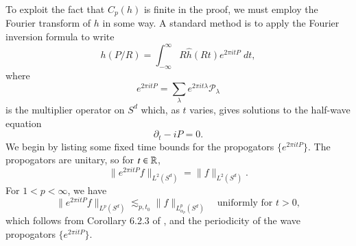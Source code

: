 

To exploit the fact that $C_p(h)$ is finite in the proof, we must employ the Fourier transform of $h$ in some way. A standard method is to apply the Fourier inversion formula to write
%
\[ h(P/R) = \int_{-\infty}^\infty R \widehat{h}(Rt) e^{2 \pi i t P}\; dt, \]
%
where
%
\[ e^{2 \pi i t P} = \sum_\lambda e^{2 \pi i t \lambda} \mathcal{P}_\lambda \]
%
is the multiplier operator on $S^d$ which, as $t$ varies, gives solutions to the half-wave equation
%
\[ \partial_t - i P = 0. \]
%
%
%
%
%
%
%
We begin by listing some fixed time bounds for the propogators $\{ e^{2 \pi i t P} \}$. The propogators are unitary, so for $t \in \operatorname{\mathbb{R}}$,
%
\[ \| e^{2 \pi i t P} f \|_{L^2(S^d)} = \| f \|_{L^2(S^d)}. \]
%
For $1 < p < \infty$, we have
%
\[ \| e^{2 \pi i t P} f \|_{L^p(S^d)} \lesssim_{p,t_0} \| f \|_{L^p_{\alpha_p}(S^d)} \quad\text{uniformly for $t > 0$}, \]
%
which follows from Corollary 6.2.3 of \cite{Sogge}, and the periodicity of the wave propogators $\{ e^{2 \pi i t P} \}$.

